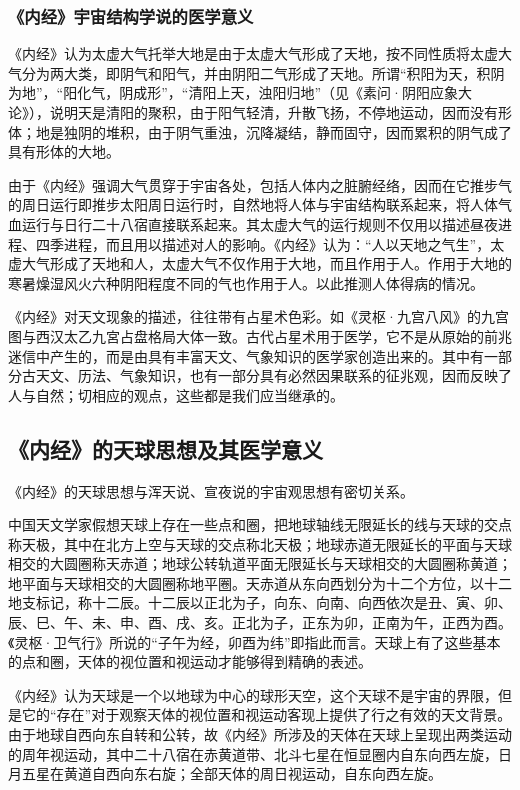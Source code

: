 \documentclass[draft,12pt]{ctexbook}
\begin{document}
\subsubsection{《内经》宇宙结构学说的医学意义}%

《内经》认为太虚大气托举大地是由于太虚大气形成了天地，按不同性质将太虚大气分为两大类，即阴气和阳气，并由阴阳二气形成了天地。所谓“积阳为天，积阴为地”，“阳化气，阴成形”，“清阳上天，浊阳归地”（见《素问·阴阳应象大论》），说明天是清阳的聚积，由于阳气轻清，升散飞扬，不停地运动，因而没有形体；地是独阴的堆积，由于阴气重浊，沉降凝结，静而固守，因而累积的阴气成了具有形体的大地。

由于《内经》强调大气贯穿于宇宙各处，包括人体内之脏腑经络，因而在它推步气的周日运行即推步太阳周日运行时，自然地将人体与宇宙结构联系起来，将人体气血运行与日行二十八宿直接联系起来。其太虚大气的运行规则不仅用以描述昼夜进程、四季进程，而且用以描述对人的影响。《内经》认为：“人以天地之气生”，太虚大气形成了天地和人，太虚大气不仅作用于大地，而且作用于人。作用于大地的寒暑燥湿风火六种阴阳程度不同的气也作用于人。以此推测人体得病的情况。

《内经》对天文现象的描述，往往带有占星术色彩。如《灵枢·九宫八风》的九宫图与西汉太乙九宮占盘格局大体一致。古代占星术用于医学，它不是从原始的前兆迷信中产生的，而是由具有丰富天文、气象知识的医学家创造出来的。其中有一部分古天文、历法、气象知识，也有一部分具有必然因果联系的征兆观，因而反映了人与自然；切相应的观点，这些都是我们应当继承的。

\subsection{《内经》的天球思想及其医学意义}%

《内经》的天球思想与浑天说、宣夜说的宇宙观思想有密切关系。

中国天文学家假想天球上存在一些点和圈，把地球轴线无限延长的线与天球的交点称天极，其中在北方上空与天球的交点称北天极；地球赤道无限延长的平面与天球相交的大圆圈称天赤道；地球公转轨道平面无限延长与天球相交的大圆圈称黄道；地平面与天球相交的大圆圈称地平圈。天赤道从东向西划分为十二个方位，以十二地支标记，称十二辰。十二辰以正北为子，向东、向南、向西依次是丑、寅、卯、辰、巳、午、未、申、酉、戌、亥。正北为子，正东为卯，正南为午，正西为酉。《灵枢·卫气行》所说的“子午为经，卯酉为纬”即指此而言。天球上有了这些基本的点和圈，天体的视位置和视运动才能够得到精确的表述。

《内经》认为天球是一个以地球为中心的球形天空，这个天球不是宇宙的界限，但是它的“存在”对于观察天体的视位置和视运动客现上提供了行之有效的天文背景。由于地球自西向东自转和公转，故《内经》所涉及的天体在天球上呈现出两类运动的周年视运动，其中二十八宿在赤黄道带、北斗七星在恒显圈内自东向西左旋，日月五星在黄道自西向东右旋；全部天体的周日视运动，自东向西左旋。
\end{document}
